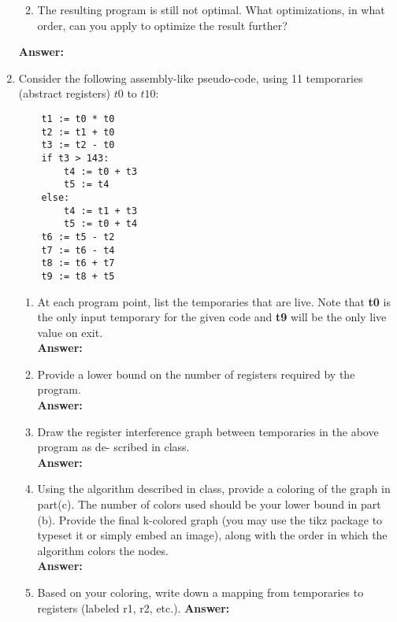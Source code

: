 \documentclass[11pt]{article}
\begin{document}
\begin{enumerate}
\begin{enumerate}
    \newpage
  
  \item The resulting program is still not optimal. What optimizations, in what order, can you apply to optimize the result further?

\end{enumerate}
    \textbf{Answer:} 
    
   \newpage
  
  
  \item  Consider the following assembly-like pseudo-code, using 11 temporaries (abstract registers) $t0$ to $t10$: \\
  
  \begin{lstlisting}
    t1 := t0 * t0
    t2 := t1 + t0
    t3 := t2 - t0
    if t3 > 143:
        t4 := t0 + t3
        t5 := t4
    else:
        t4 := t1 + t3
        t5 := t0 + t4
    t6 := t5 - t2
    t7 := t6 - t4
    t8 := t6 + t7
    t9 := t8 + t5
  \end{lstlisting}
  
  \begin{enumerate}
      \item At each program point, list the temporaries that are live. Note that \textbf{t0} is the only input temporary for the given code and \textbf{t9} will be the only live value on exit.\\
    \textbf{Answer:} 
    
   \newpage
      \item Provide a lower bound on the number of registers required by the program. \\
    \textbf{Answer:} 
    
   \newpage
      \item Draw the register interference graph between temporaries in the above program as de- scribed in class.\\
    \textbf{Answer:} 
    
   \newpage
      \item Using the algorithm described in class, provide a coloring of the graph in part(c). The number of colors used should be your lower bound in part (b). Provide the final k-colored graph (you may use the tikz package to typeset it or simply embed an image), along with the order in which the algorithm colors the nodes.\\
    \textbf{Answer:} 
    
   \newpage
      \item Based on your coloring, write down a mapping from temporaries to registers (labeled r1, r2, etc.).
    \textbf{Answer:} 
    
   \newpage
  \end{enumerate}

  
\end{enumerate}   
\end{document}
